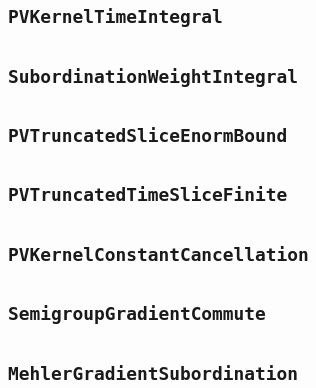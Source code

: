 \documentclass[11pt]{amsart}
\theoremstyle{definition}
\begin{document}
\subsection{\texorpdfstring{\texttt{PVKernelTimeIntegral}}{PVKernelTimeIntegral}}\label{node:PVKernelTimeIntegral}


\subsection{\texorpdfstring{\texttt{SubordinationWeightIntegral}}{SubordinationWeightIntegral}}\label{node:SubordinationWeightIntegral}


\subsection{\texorpdfstring{\texttt{PVTruncatedSliceEnormBound}}{PVTruncatedSliceEnormBound}}\label{node:PVTruncatedSliceEnormBound}


\subsection{\texorpdfstring{\texttt{PVTruncatedTimeSliceFinite}}{PVTruncatedTimeSliceFinite}}\label{node:PVTruncatedTimeSliceFinite}


\subsection{\texorpdfstring{\texttt{PVKernelConstantCancellation}}{PVKernelConstantCancellation}}\label{node:PVKernelConstantCancellation}


\subsection{\texorpdfstring{\texttt{SemigroupGradientCommute}}{SemigroupGradientCommute}}\label{node:SemigroupGradientCommute}


\subsection{\texorpdfstring{\texttt{MehlerGradientSubordination}}{MehlerGradientSubordination}}\label{node:MehlerGradientSubordination}

\end{document}
